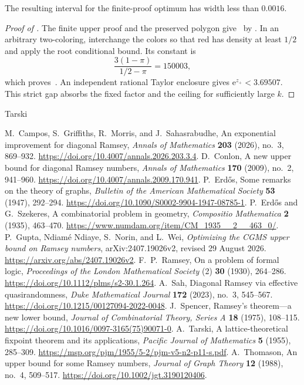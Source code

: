 \documentclass[11pt]{article}
\theoremstyle{definition}
\newcommand{\e}{\mathrm e}
\begin{document}
The resulting interval for the finite-proof optimum has width less than $0.0016$.

\begin{proof}[Proof of ]
The finite upper proof and the preserved polygon give~ by .
In an arbitrary two-coloring, interchange the colors so that red has density at least $1/2$ and apply the root conditional bound.
Its constant is
\[
 \frac{3(1-\pi)}{1/2-\pi}=150003,
\]
which proves~.
An independent rational Taylor enclosure gives $\e^{z_+}<3.69507$.
This strict gap absorbs the fixed factor and the ceiling for sufficiently large $k$.
\end{proof}


\clearpage
\begin{thebibliography}{Tarski}\raggedright
{} M.~Campos, S.~Griffiths, R.~Morris, and J.~Sahasrabudhe, An exponential improvement for diagonal Ramsey, \emph{Annals of Mathematics} \textbf{203} (2026), no.~3, 869--932. \url{https://doi.org/10.4007/annals.2026.203.3.4}.
 D.~Conlon, A new upper bound for diagonal Ramsey numbers, \emph{Annals of Mathematics} \textbf{170} (2009), no.~2, 941--960. \url{https://doi.org/10.4007/annals.2009.170.941}.
 P.~Erd\H{o}s, Some remarks on the theory of graphs, \emph{Bulletin of the American Mathematical Society} \textbf{53} (1947), 292--294. \url{https://doi.org/10.1090/S0002-9904-1947-08785-1}.
 P.~Erd\H{o}s and G.~Szekeres, A combinatorial problem in geometry, \emph{Compositio Mathematica} \textbf{2} (1935), 463--470. \url{https://www.numdam.org/item/CM_1935__2__463_0/}.
 P.~Gupta, Ndiam\'e Ndiaye, S.~Norin, and L.~Wei, \emph{Optimizing the CGMS upper bound on Ramsey numbers}, arXiv:2407.19026v2, revised 29 August 2026. \url{https://arxiv.org/abs/2407.19026v2}.
 F.~P.~Ramsey, On a problem of formal logic, \emph{Proceedings of the London Mathematical Society} (2) \textbf{30} (1930), 264--286. \url{https://doi.org/10.1112/plms/s2-30.1.264}.
 A.~Sah, Diagonal Ramsey via effective quasirandomness, \emph{Duke Mathematical Journal} \textbf{172} (2023), no.~3, 545--567. \url{https://doi.org/10.1215/00127094-2022-0048}.
 J.~Spencer, Ramsey's theorem---a new lower bound, \emph{Journal of Combinatorial Theory, Series A} \textbf{18} (1975), 108--115. \url{https://doi.org/10.1016/0097-3165(75)90071-0}.
 A.~Tarski, A lattice-theoretical fixpoint theorem and its applications, \emph{Pacific Journal of Mathematics} \textbf{5} (1955), 285--309. \url{https://msp.org/pjm/1955/5-2/pjm-v5-n2-p11-s.pdf}.
 A.~Thomason, An upper bound for some Ramsey numbers, \emph{Journal of Graph Theory} \textbf{12} (1988), no.~4, 509--517. \url{https://doi.org/10.1002/jgt.3190120406}.
\end{thebibliography}
\end{document}
